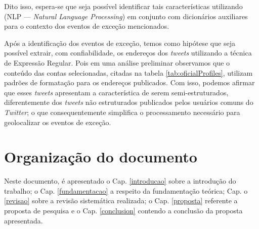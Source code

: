 \documentclass[
	12pt,				%
	oneside,			%
	a4paper,			%
	english,			%
	brazil				%
	]{abntex2ppgsi}
\begin{document}
Dito isso, espera-se que seja possível identificar tais características utilizando  (NLP --- \textit{Natural Language Processing}) em conjunto com dicionários auxiliares para o contexto dos eventos de exceção mencionados.

Após a identificação dos eventos de exceção, temos como hipótese que seja possível extrair, com confiabilidade, os endereços dos \textit{tweets} utilizando a técnica de Expressão Regular. Pois em uma análise preliminar observamos que o conteúdo das contas selecionadas, citadas na tabela \ref{tab:oficialProfiles}, utilizam padrões de formatação para os endereços publicados. Com isso, podemos afirmar que esses \textit{tweets} apresentam a característica de serem semi-estruturados, diferentemente dos \textit{tweets} não estruturados publicados pelos usuários comuns do \textit{Twitter}; o que consequentemente simplifica o processamento necessário para geolocalizar os eventos de exceção.

\section{Organização do documento}
\label{docOrg}

Neste documento, é apresentado o Cap. \ref{introducao} sobre a introdução do trabalho; o Cap. \ref{fundamentacao} a respeito da fundamentação teórica;  Cap. o \ref{revisao} sobre a revisão sistemática realizada; o Cap. \ref{proposta} referente a proposta de pesquisa e o Cap. \ref{conclusion} contendo a conclusão da proposta apresentada.

% 
%
%
%
%
\end{document}

